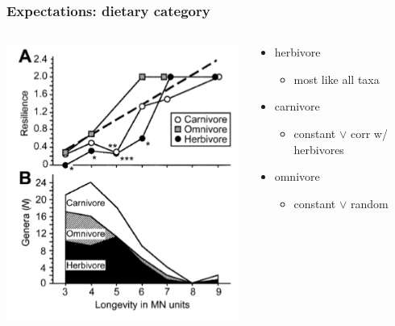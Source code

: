 \documentclass{beamer} \usepackage{amsmath,amsthm}
\begin{document}
\begin{frame}
  \frametitle{Expectations: dietary category}

  \begin{columns}
    \begin{column}{0.6\textwidth}
      \includegraphics[height=0.7\textheight,width=\textwidth,keepaspectratio=true]{figure/jernvall}

      \tiny{}
    \end{column}
    \begin{column}{0.4\textwidth}
      \begin{itemize}
        \item herbivore
          \begin{itemize}
            \item most like all taxa
          \end{itemize}
        \item carnivore
          \begin{itemize}
            \item constant \(\lor\) corr w/ herbivores
          \end{itemize}
        \item omnivore
          \begin{itemize}
            \item constant \(\lor\) random
          \end{itemize}
      \end{itemize}
    \end{column}
  \end{columns}
\end{frame}
\end{document}
